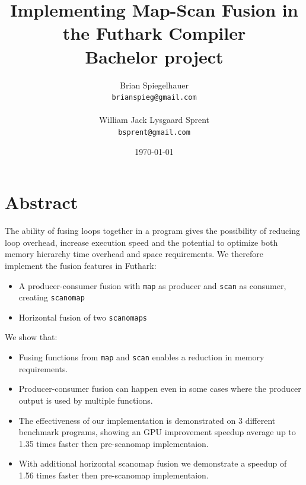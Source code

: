 \documentclass[11pt]{article}
\title{
  \vspace{3cm}
  \Huge{Implementing Map-Scan Fusion in the Futhark Compiler} \\
  \Large{Bachelor project}
}
\author{
  \Large{Brian Spiegelhauer}
  \\ \texttt{brianspieg@gmail.com} \\ \\
   \Large{William Jack Lysgaard Sprent}
  \\ \texttt{bsprent@gmail.com} \\
}
\date{
    \today
}
\def \ColourPDF {include/nat-farve}
\def \TitlePDF   {include/nat-en}  %
\begin{document}
\lstset{language=C, frame=single, numbers=left, breaklines=true}



\clearpage\maketitle
\thispagestyle{empty}

\newpage

\tableofcontents

\newpage

\section{Abstract}
The ability of fusing loops together in a program gives the possibility of reducing loop overhead, increase execution speed and the potential to optimize both memory hierarchy time overhead and space requirements. We therefore implement the fusion features in Futhark:

\begin{itemize}
\item A producer-consumer fusion with \texttt{map} as producer and \texttt{scan} as consumer, creating \texttt{scanomap}
\item Horizontal fusion of two \texttt{scanomaps}
\end{itemize}
We show that:
\begin{itemize}
\item Fusing functions from \texttt{map} and \texttt{scan} enables a reduction in memory requirements.
\item Producer-consumer fusion can happen even in some cases where the producer output is used by multiple functions.
\item The effectiveness of our implementation is demonstrated on 3 different benchmark programs, showing an GPU improvement speedup average up to 1.35 times faster then pre-scanomap implementaion.  
\item With additional horizontal scanomap fusion we demonstrate a speedup of 1.56 times faster then pre-scanomap implementaion.
\end{itemize}
\end{document}
